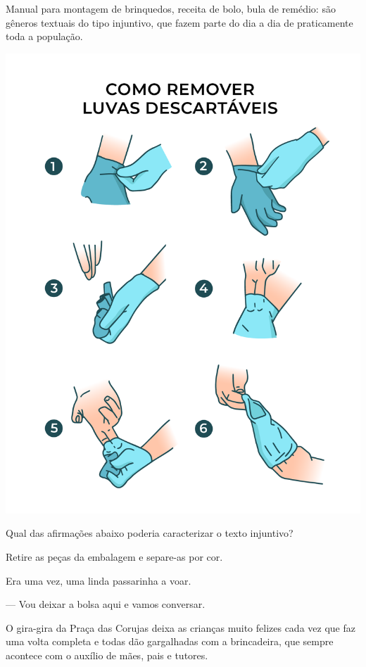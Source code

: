 \begin{myquote}
Manual para montagem de brinquedos, receita de bolo, bula de remédio:
são gêneros textuais do tipo injuntivo, que fazem parte do dia a dia de
praticamente toda a população.

\begin{center}
\includegraphics[width=.75\textwidth]{./media/image23m.png}
\end{center}

\end{myquote}

\pagebreak
Qual das afirmações abaixo poderia caracterizar o texto injuntivo?

\begin{escolha}
\item Retire as peças da embalagem e separe-as por cor.

\item Era uma vez, uma linda passarinha a voar.

\item --- Vou deixar a bolsa aqui e vamos conversar.

\item O gira-gira da Praça das Corujas deixa as crianças muito felizes cada vez que faz uma volta completa e todas dão gargalhadas com a brincadeira, que sempre acontece com o auxílio de mães, pais e tutores. 
\end{escolha}


